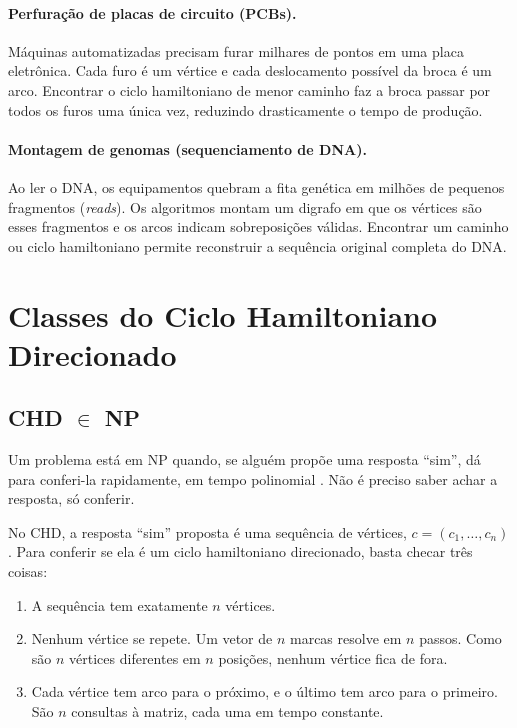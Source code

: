 \documentclass[12pt,a4paper]{article}
\begin{document}
\paragraph{Perfuração de placas de circuito (PCBs).} Máquinas automatizadas precisam furar milhares de pontos em uma placa eletrônica. Cada furo é um vértice e cada deslocamento possível da broca é um arco. Encontrar o ciclo hamiltoniano de menor caminho faz a broca passar por todos os furos uma única vez, reduzindo drasticamente o tempo de produção.

\paragraph{Montagem de genomas (sequenciamento de DNA).} Ao ler o DNA, os equipamentos quebram a fita genética em milhões de pequenos fragmentos (\emph{reads}). Os algoritmos montam um digrafo em que os vértices são esses fragmentos e os arcos indicam sobreposições válidas. Encontrar um caminho ou ciclo hamiltoniano permite reconstruir a sequência original completa do DNA.

\section{Classes do Ciclo Hamiltoniano Direcionado}
\label{sec:prova}

\subsection{CHD $\in$ NP}

Um problema está em NP quando, se alguém propõe uma resposta ``sim'', dá para conferi-la rapidamente, em tempo polinomial \cite{cormen2009,ziviani2006}. Não é preciso saber achar a resposta, só conferir.

No CHD, a resposta ``sim'' proposta é uma sequência de vértices, $c=(c_1,\dots,c_n)$. Para conferir se ela é um ciclo hamiltoniano direcionado, basta checar três coisas:

\begin{enumerate}
  \item A sequência tem exatamente $n$ vértices.
  \item Nenhum vértice se repete. Um vetor de $n$ marcas resolve em $n$ passos. Como são $n$ vértices diferentes em $n$ posições, nenhum vértice fica de fora.
  \item Cada vértice tem arco para o próximo, e o último tem arco para o primeiro. São $n$ consultas à matriz, cada uma em tempo constante.
\end{enumerate}
\end{document}
